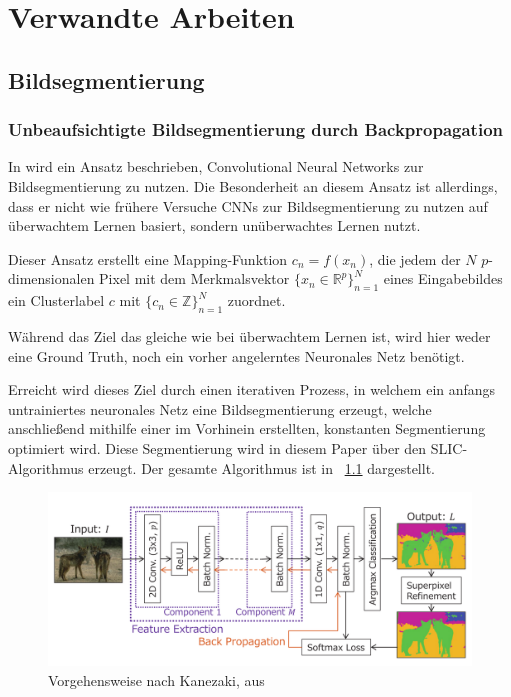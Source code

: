 \chapter{Verwandte Arbeiten}
\label{chap:verwarbeiten}

\section{Bildsegmentierung}
\label{sec:segmentation}

\subsection{Unbeaufsichtigte Bildsegmentierung durch Backpropagation}
\label{ssec:kanezaki}
In \cite{kanezaki_18} wird ein Ansatz beschrieben, Convolutional Neural Networks zur Bildsegmentierung zu nutzen. Die Besonderheit an diesem Ansatz ist allerdings, dass er nicht wie frühere Versuche CNNs zur Bildsegmentierung zu nutzen auf überwachtem Lernen basiert, sondern unüberwachtes Lernen nutzt.

Dieser Ansatz erstellt eine Mapping-Funktion $c_n=f(x_n)$, die jedem der $N$ $p$-dimensionalen Pixel mit dem Merkmalsvektor $\{x_n\in\mathbb{R}^p\}_{n=1}^N$ eines Eingabebildes ein Clusterlabel $c$ mit $\{c_n\in\mathbb{Z}\}_{n=1}^N$ zuordnet.

Während das Ziel das gleiche wie bei überwachtem Lernen ist, wird hier weder eine Ground Truth, noch ein vorher angelerntes Neuronales Netz benötigt.

Erreicht wird dieses Ziel durch einen iterativen Prozess, in welchem ein anfangs untrainiertes neuronales Netz eine Bildsegmentierung erzeugt, welche anschließend mithilfe einer im Vorhinein erstellten, konstanten Segmentierung optimiert wird. Diese Segmentierung wird in diesem Paper über den SLIC-Algorithmus \cite{achanta_10} erzeugt. Der gesamte Algorithmus ist in \figurename~\ref{fig:Kan18_01} dargestellt. 

\begin{figure}[h]
	\centering
	\includegraphics[width=.8\textwidth,keepaspectratio]{images/Kan18_01.png}
	\caption{Vorgehensweise nach Kanezaki, aus \cite{kanezaki_18}}
	\label{fig:Kan18_01}
\end{figure}

